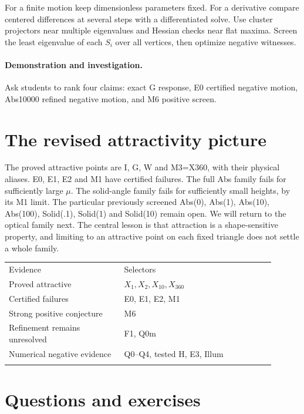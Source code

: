 \documentclass[11pt,oneside,openany]{book}
\newcommand{\toprule}{\hline\noalign{\vskip4pt}}
\newcommand{\midrule}{\noalign{\vskip3pt}\hline\noalign{\vskip4pt}}
\newcommand{\bottomrule}{\noalign{\vskip3pt}\hline}
\begin{document}
For a finite motion keep dimensionless parameters fixed. For a
derivative compare centered differences at several steps with a
differentiated solve. Use cluster projectors near multiple
eigenvalues and Hessian checks near flat maxima.
Screen the least eigenvalue of each $S_i$ over all vertices, then
optimize negative witnesses.




\paragraph{Demonstration and investigation.} Ask students to rank four claims: exact G response, E0 certified negative motion, Abs10000 refined negative motion, and M6 positive screen.


\section{The revised attractivity picture}\label{sec:slide75}

The proved attractive points are I, G, W and M3=X360, with their physical aliases. E0, E1, E2 and M1 have certified failures. The full Abs family fails for sufficiently large \ensuremath{\mu}. The solid-angle family fails for sufficiently small heights, by its M1 limit. The particular previously screened Abs(0), Abs(1), Abs(10), Abs(100), Solid(.1), Solid(1) and Solid(10) remain open. We will return to the optical family next. The central lesson is that attraction is a shape-sensitive property, and limiting to an attractive point on each fixed triangle does not settle a whole family.


\begin{center}\small\begin{tabular}{p{0.39\linewidth}p{0.51\linewidth}}\toprule
Evidence & Selectors\\\midrule
Proved attractive & $X_1,X_2,X_{10},X_{360}$\\
Certified failures & E0, E1, E2, M1\\
Strong positive conjecture & M6\\
Refinement remains unresolved & F1, Q0m\\
Numerical negative evidence & Q0--Q4, tested H, E3, Illum\\\bottomrule\end{tabular}\end{center}

\section*{Questions and exercises}
\end{document}
